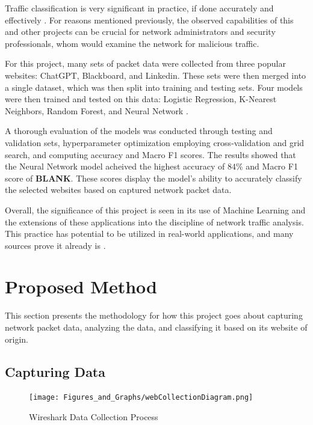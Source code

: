 \documentclass[10pt,sigconf,letterpaper,nonacm]{acmart}
\begin{document}
  Traffic classification is very significant in practice, if done accurately and effectively \cite{10.1109/TNET.2014.2320577}. For reasons mentioned previously, the observed capabilities of this and other projects 
  can be crucial for network administrators and security professionals, whom would examine the network for malicious traffic.

  For this project, many sets of packet data were collected from three popular websites: ChatGPT, Blackboard, and Linkedin. These sets were then merged into a single dataset, which was then split into training and testing sets. 
  Four models were then trained and tested on this data: Logistic Regression, K-Nearest Neighbors, Random Forest, and Neural Network \cite{scikit-learn}. 

  A thorough evaluation of the models was conducted through testing and validation sets, hyperparameter optimization employing cross-validation and grid search, and computing accuracy and Macro F1 scores. The results showed that the Neural Network model 
  acheived the highest accuracy of $84\%$ and Macro F1 score of { \bf BLANK}. %
  These scores display the model's ability to accurately classify the selected websites based on captured network packet data.

  Overall, the significance of this project is seen in its use of Machine Learning and the extensions of these applications into the discipline of network traffic analysis. This practice has potential to be utilized in real-world applications, and many sources
  prove it already is \cite{10.5555/3432601.3432608}. 

\section{Proposed Method}
This section presents the methodology for how this project goes about capturing network packet data, analyzing the data, and classifying it based on its website of origin.

\subsection{Capturing Data}

\begin{figure}[t]
  \centering
  \texttt{[image: Figures\_and\_Graphs/webCollectionDiagram.png]}
  \caption{Wireshark Data Collection Process}
  \label{fig:dataCollection}
\end{figure}
\end{document}
